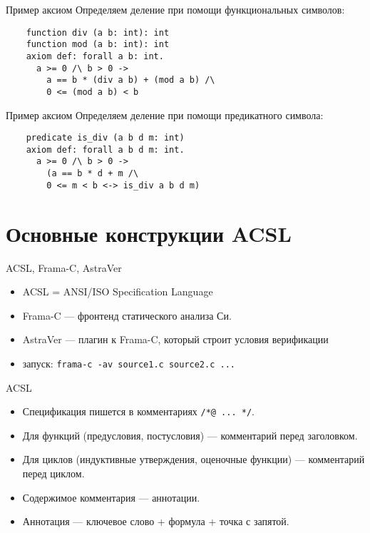 \documentclass[hyperref={unicode=true}]{beamer}
\begin{document}
    \begin{frame}[fragile]{Пример аксиом}
    Определяем деление при помощи функциональных символов:
    \begin{verbatim}
    function div (a b: int): int
    function mod (a b: int): int
    axiom def: forall a b: int.
      a >= 0 /\ b > 0 ->
        a == b * (div a b) + (mod a b) /\
        0 <= (mod a b) < b
    \end{verbatim}
    \end{frame}

    \begin{frame}[fragile]{Пример аксиом}
    Определяем деление при помощи предикатного символа:
    \begin{verbatim}
    predicate is_div (a b d m: int)
    axiom def: forall a b d m: int.
      a >= 0 /\ b > 0 ->
        (a == b * d + m /\
        0 <= m < b <-> is_div a b d m)
    \end{verbatim}
    \end{frame}

    \section{Основные конструкции ACSL}

    \begin{frame}{ACSL, Frama-C, AstraVer}
    \begin{itemize}
    \item ACSL = ANSI/ISO Specification Language
    \item Frama-C --- фронтенд статического анализа Си.
    \item AstraVer --- плагин к Frama-C, который строит условия верификации
    \item запуск: \texttt{frama-c -av source1.c source2.c ...}
    \end{itemize}
    \end{frame}

    \begin{frame}{ACSL}
    \begin{itemize}
    \item Спецификация пишется в комментариях \texttt{/*@ ... */}.
    \item Для функций (предусловия, постусловия) --- комментарий перед заголовком.
    \item Для циклов (индуктивные утверждения, оценочные функции) --- комментарий перед циклом.
    \item Содержимое комментария --- аннотации.
    \item Аннотация --- ключевое слово + формула + точка с запятой.
    \end{itemize}
    \end{frame}
\end{document}
